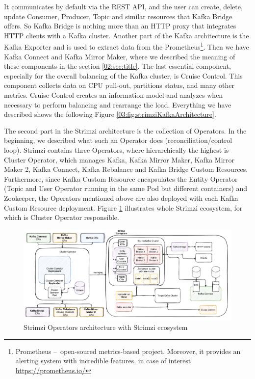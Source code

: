 It communicates by default via the REST API, and the user can create, delete, update Consumer, Producer, Topic and similar resources that Kafka Bridge offers.  So Kafka Bridge is nothing more than an HTTP proxy that integrates HTTP clients with a Kafka cluster. Another part of the Kafka architecture is the Kafka Exporter and is used to extract data from the Prometheus\footnote{Prometheus \---\ open-soured metrics-based project. Moreover, it provides an alerting system with incredible features, in case of interest \url{https://prometheus.io/}}. Then we have Kafka Connect and Kafka Mirror Maker, where we described the meaning of these components in the section \ref{02:sec:title}. The last essential component, especially for the overall balancing of the Kafka cluster, is Cruise Control. This component collects data on CPU pull-out, partitions status, and many other metrics. Cruise Control creates an information model and analyzes when necessary to perform balancing and rearrange the load. Everything we have described shows the following Figure \ref{03:fig:strimziKafkaArchitecture}.

The second part in the Strimzi architecture is the collection of Operators. In the beginning, we described what such an Operator does (reconciliation/control loop). Strimzi contains three Operators, where hierarchically the highest is Cluster Operator, which manages Kafka, Kafka Mirror Maker, Kafka Mirror Maker 2, Kafka Connect, Kafka Rebalance and Kafka Bridge Custom Resources. Furthermore, since Kafka Custom Resource encapsulates the Entity Operator (Topic and User Operator running in the same Pod but different containers) and Zookeeper, the Operators mentioned above are also deployed with each Kafka Custom Resource deployment. Figure \ref{03:fig:strimziOperatorsArchitecture} illustrates whole Strimzi ecosystem, for which is Cluster Operator responsible.

\begin{figure}[!ht]
    \centering
    \includegraphics[scale=0.60]{obrazky-figures/02-preliminaries/03-strimzi/04-stirmziOperatorsArch.pdf}
    \caption{Strimzi Operators architecture with Strimzi ecosystem}
    \label{03:fig:strimziOperatorsArchitecture}
\end{figure}


